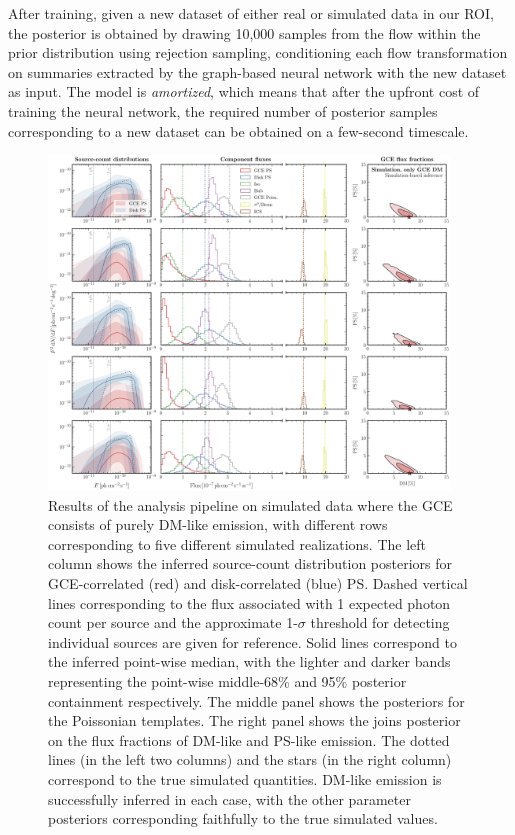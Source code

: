 \documentclass[prd,aps,10pt,nofootinbib,twocolumn,superscriptaddress,preprintnumbers,balancelastpage,longbibliography]{revtex4-1}
\begin{document}
After training, given a new dataset of either real or simulated \Fermi data in our ROI, the posterior is obtained by drawing 10,000 samples from the flow within the prior distribution using rejection sampling, conditioning each flow transformation on summaries extracted by the graph-based neural network with the new dataset as input. The model is \emph{amortized}, which means that after the upfront cost of training the neural network, the required number of posterior samples corresponding to a new dataset can be obtained on a few-second timescale.

%
\begin{figure}
\centering
\includegraphics[width=0.95\textwidth]{plots/sim_sbi_dm.pdf}
\caption{Results of the analysis pipeline on simulated \Fermi data where the GCE consists of purely DM-like emission, with different rows corresponding to five different simulated realizations. The left column shows the inferred source-count distribution posteriors for GCE-correlated (red) and disk-correlated (blue) PS. Dashed vertical lines corresponding to the flux associated with 1 expected photon count per source and the approximate 1-$\sigma$ threshold for detecting individual sources are given for reference. Solid lines correspond to the inferred point-wise median, with the lighter and darker bands representing the point-wise middle-68\% and 95\% posterior containment respectively. The middle panel shows the posteriors for the Poissonian templates. The right panel shows the joins posterior on the flux fractions of DM-like and PS-like emission. The dotted lines (in the left two columns) and the stars (in the right column) correspond to the true simulated quantities. DM-like emission is successfully inferred in each case, with the other parameter posteriors corresponding faithfully to the true simulated values.} 
\label{fig:sim_sbi_dm}
\end{figure}
%
\end{document}
